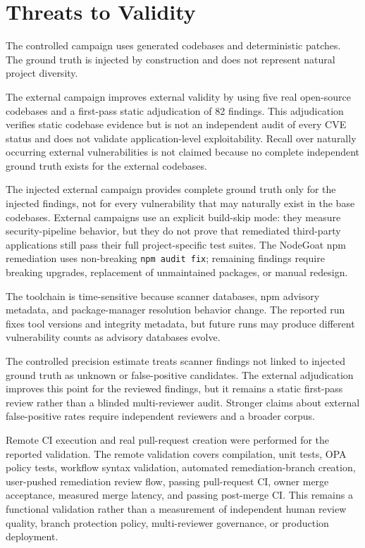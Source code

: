 \section{Threats to Validity}

The controlled campaign uses generated codebases and deterministic patches. The ground truth is injected by construction and does not represent natural project diversity.

The external campaign improves external validity by using five real open-source codebases and a first-pass static adjudication of 82 findings. This adjudication verifies static codebase evidence but is not an independent audit of every CVE status and does not validate application-level exploitability. Recall over naturally occurring external vulnerabilities is not claimed because no complete independent ground truth exists for the external codebases.

The injected external campaign provides complete ground truth only for the injected findings, not for every vulnerability that may naturally exist in the base codebases. External campaigns use an explicit build-skip mode: they measure security-pipeline behavior, but they do not prove that remediated third-party applications still pass their full project-specific test suites. The NodeGoat npm remediation uses non-breaking \texttt{npm audit fix}; remaining findings require breaking upgrades, replacement of unmaintained packages, or manual redesign.

The toolchain is time-sensitive because scanner databases, npm advisory metadata, and package-manager resolution behavior change. The reported run fixes tool versions and integrity metadata, but future runs may produce different vulnerability counts as advisory databases evolve.

The controlled precision estimate treats scanner findings not linked to injected ground truth as unknown or false-positive candidates. The external adjudication improves this point for the reviewed findings, but it remains a static first-pass review rather than a blinded multi-reviewer audit. Stronger claims about external false-positive rates require independent reviewers and a broader corpus.

Remote CI execution and real pull-request creation were performed for the reported validation. The remote validation covers compilation, unit tests, OPA policy tests, workflow syntax validation, automated remediation-branch creation, user-pushed remediation review flow, passing pull-request CI, owner merge acceptance, measured merge latency, and passing post-merge CI. This remains a functional validation rather than a measurement of independent human review quality, branch protection policy, multi-reviewer governance, or production deployment.
